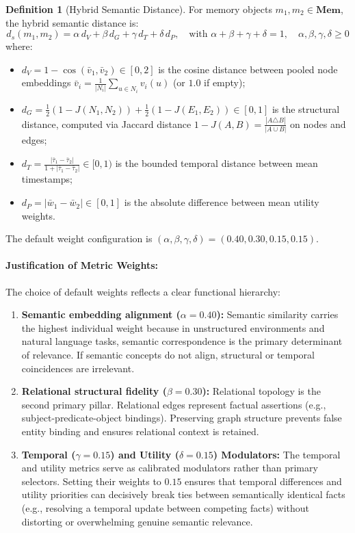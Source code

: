 \documentclass[11pt,a4paper]{article}
\theoremstyle{definition}
\newtheorem{definition}{Definition}[section]
\begin{document}
\begin{definition}[Hybrid Semantic Distance]
For memory objects $m_1, m_2 \in \mathbf{Mem}$, the hybrid semantic distance is:
\[
d_s(m_1, m_2) = \alpha\, d_V + \beta\, d_G + \gamma\, d_T + \delta\, d_P, \quad \text{with } \alpha + \beta + \gamma + \delta = 1, \quad \alpha,\beta,\gamma,\delta \geq 0
\]
where:
\begin{itemize}
    \item $d_V = 1 - \cos(\bar{v}_1, \bar{v}_2) \in [0, 2]$ is the cosine distance between pooled node embeddings $\bar{v}_i = \frac{1}{|N_i|}\sum_{u \in N_i} v_i(u)$ (or $1.0$ if empty);
    \item $d_G = \frac{1}{2}(1 - J(N_1, N_2)) + \frac{1}{2}(1 - J(E_1, E_2)) \in [0, 1]$ is the structural distance, computed via Jaccard distance $1 - J(A, B) = \frac{|A \triangle B|}{|A \cup B|}$ on nodes and edges;
    \item $d_T = \frac{|\bar{\tau}_1 - \bar{\tau}_2|}{1 + |\bar{\tau}_1 - \bar{\tau}_2|} \in [0, 1)$ is the bounded temporal distance between mean timestamps;
    \item $d_P = |\bar{w}_1 - \bar{w}_2| \in [0, 1]$ is the absolute difference between mean utility weights.
\end{itemize}
The default weight configuration is $(\alpha, \beta, \gamma, \delta) = (0.40, 0.30, 0.15, 0.15)$.
\end{definition}

\paragraph{Justification of Metric Weights:}
The choice of default weights reflects a clear functional hierarchy:
\begin{enumerate}
    \item \textbf{Semantic embedding alignment ($\alpha = 0.40$):} Semantic similarity carries the highest individual weight because in unstructured environments and natural language tasks, semantic correspondence is the primary determinant of relevance. If semantic concepts do not align, structural or temporal coincidences are irrelevant.
    \item \textbf{Relational structural fidelity ($\beta = 0.30$):} Relational topology is the second primary pillar. Relational edges represent factual assertions (e.g., subject-predicate-object bindings). Preserving graph structure prevents false entity binding and ensures relational context is retained.
    \item \textbf{Temporal ($\gamma = 0.15$) and Utility ($\delta = 0.15$) Modulators:} The temporal and utility metrics serve as calibrated modulators rather than primary selectors. Setting their weights to $0.15$ ensures that temporal differences and utility priorities can decisively break ties between semantically identical facts (e.g., resolving a temporal update between competing facts) without distorting or overwhelming genuine semantic relevance.
\end{enumerate}
\end{document}
